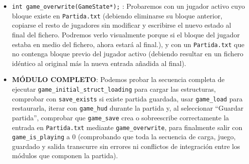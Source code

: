 \begin{itemize}
\begin{itemize}
			\item \verb|int game_overwrite(GameState*);| : Probaremos con un jugador activo cuyo bloque existe en 
			\verb|Partida.txt| (debiendo eliminarse su bloque anterior, copiarse el resto de jugadores sin modificar 
			y escribirse el nuevo estado al final del fichero. Podremos verlo visualmente porque si el bloque del jugador estaba en medio 
			del fichero, ahora estará al final.), 
			y con un \verb|Partida.txt| que no contenga bloque 
			previo del jugador activo (debiendo resultar en un fichero idéntico al original más la nueva entrada añadida al final).
			\\ \item \textbf{MÓDULO COMPLETO}: Podemos probar la secuencia completa de ejecutar \verb|game_initial_struct_loading| 
			para cargar las estructuras, comprobar con \verb|save_exists| si existe partida guardada, usar \verb|game_load| para restaurarla, 
			iterar con \verb|game_hud| durante la partida y, al seleccionar ``Guardar partida'', comprobar que \verb|game_save| 
			crea o sobreescribe correctamente la entrada en \verb|Partida.txt| mediante \verb|game_overwrite|, 
			para finalmente salir con \verb|game_is_playing| a 0 (comprobando que toda la secuencia de carga, juego, 
			guardado y salida transcurre sin errores ni conflictos de integración entre los módulos que componen la partida).
		\end{itemize}


\end{itemize}
